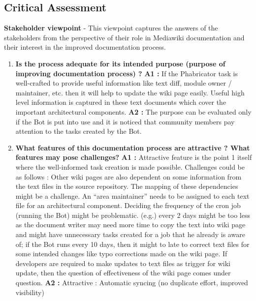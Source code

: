 \subsection{Critical Assessment}
\textbf{Stakeholder viewpoint} - This viewpoint captures the answers of the stakeholders from the perspective of their role in Mediawiki documentation and their interest in the improved documentation process.
\begin{enumerate}
\item \textbf{Is the process adequate for its intended purpose (purpose of improving documentation process) ?}
\newline \textbf{A1 :} If the Phabricator task is well-crafted to provide useful information like text diff, module owner / maintainer, etc. then it will help to update the wiki page easily. 
\newline Useful high level information is captured in these text documents which cover the important architectural components.
\newline \textbf{A2 : }The purpose can be evaluated only if the Bot is put into use and it is noticed that community members pay attention to the tasks created by the Bot.
\item \textbf{What features of this documentation process are attractive ? What features may pose challenges?}
\newline \textbf{A1 :} Attractive feature is the point 1 itself where the well-informed task creation is made possible.
Challenges could be as follows :
\newline Other wiki pages are also dependent on some information from the text files in the source repository. The mapping of these dependencies might be a challenge.
\newline An \enquote{area maintainer} needs to be assigned to each text file for an architectural component.
\newline Deciding the frequency of the cron job (running the Bot) might be problematic. (e.g.) every 2 days might be too less as the document writer may need more time to copy the text into wiki page and might have unnecessary tasks created for a job that he already is aware of; if the Bot runs every 10 days, then it might to late to correct text files for some intended changes like typo corrections made on the wiki page.
\newline If developers are required to make updates to text files as trigger for wiki update, then the question of effectiveness of the wiki page comes under question. 
\newline \textbf{A2 :} Attractive : Automatic syncing (no duplicate effort, improved visibility)

\end{enumerate}
